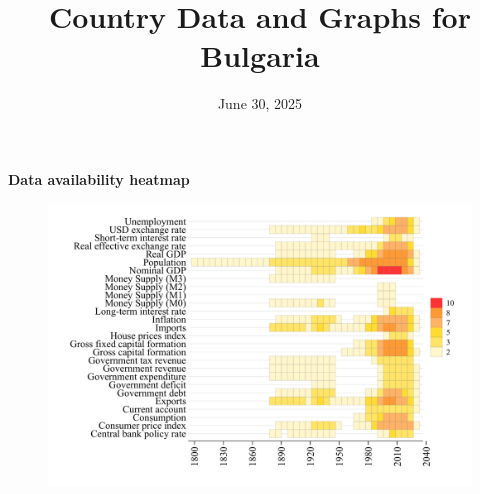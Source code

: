 \documentclass[12pt,a4paper,landscape]{article}
\begin{document}
\title{\Large Country Data and Graphs for Bulgaria}
\date{June 30, 2025}
\maketitle
\thispagestyle{empty}

\clearpage
\setcounter{page}{1}
\hypersetup{colorlinks=true,linkcolor=blue,linktoc=all}
\label{toc}
\tableofcontents
\thispagestyle{empty}
\clearpage
{}
{}
\begin{center}
{\Large\bfseries Data availability heatmap}
\end{center}
\vspace{1cm}
\begin{figure}[H]
\centering
\includegraphics[width=\textwidth,height=0.8\textheight,keepaspectratio]{graphs/BGR_heatmap.pdf}
\end{figure}
\setcounter{page}{3}
\end{document}
